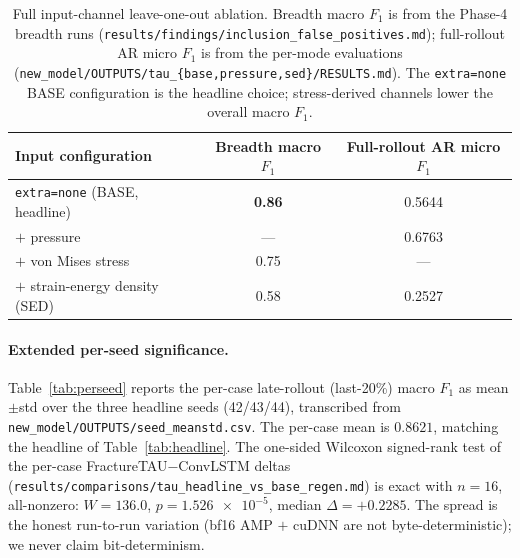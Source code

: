 \documentclass[11pt]{article}
\begin{document}
\begin{table}[hb]
\centering
\caption{Full input-channel leave-one-out ablation. Breadth macro $F_1$ is from
the Phase-4 breadth runs (\texttt{results/findings/inclusion\_false\_positives.md});
full-rollout AR micro $F_1$ is from the per-mode evaluations
(\texttt{new\_model/OUTPUTS/tau\_\{base,pressure,sed\}/RESULTS.md}). The
\texttt{extra=none} BASE configuration is the headline choice; stress-derived
channels lower the overall macro $F_1$.}
\label{tab:ablation-full}
\small
\begin{tabular}{lcc}
\toprule
Input configuration & Breadth macro $F_1$ & Full-rollout AR micro $F_1$ \\
\midrule
\texttt{extra=none} (BASE, headline) & \textbf{0.86} & 0.5644 \\
$+$ pressure                         & ---           & 0.6763 \\
$+$ von Mises stress                 & 0.75          & ---    \\
$+$ strain-energy density (SED)      & 0.58          & 0.2527 \\
\bottomrule
\end{tabular}
\end{table}

\paragraph{Extended per-seed significance.}
Table~\ref{tab:perseed} reports the per-case late-rollout (last-20\%) macro
$F_1$ as mean$\pm$std over the three headline seeds (42/43/44), transcribed from
\texttt{new\_model/OUTPUTS/seed\_meanstd.csv}. The per-case mean is $0.8621$,
matching the headline of Table~\ref{tab:headline}. The one-sided Wilcoxon
signed-rank test of the per-case FractureTAU$-$ConvLSTM deltas
(\texttt{results/comparisons/tau\_headline\_vs\_base\_regen.md}) is exact with
$n{=}16$, all-nonzero: $W{=}136.0$, $p{=}\num{1.526e-5}$, median
$\Delta{=}{+}0.2285$. The spread is the honest run-to-run variation (bf16 AMP
$+$ cuDNN are not byte-deterministic); we never claim bit-determinism.
\end{document}
